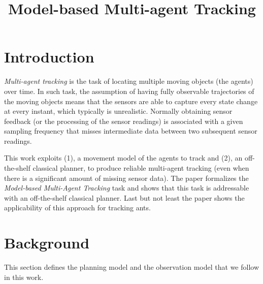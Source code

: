 \documentclass[letterpaper]{article} %
\begin{document}
\title{Model-based Multi-agent Tracking}




\maketitle
\begin{abstract}
\end{abstract}


\section{Introduction}
\label{sec:introduction}

{\em Multi-agent tracking} is the task of locating multiple moving objects (the agents) over time. In such task, the assumption of having fully observable trajectories of the moving objects means that the sensors are able to capture every state change at every instant, which typically is unrealistic. Normally obtaining sensor feedback (or the processing of the sensor readings) is associated with a given sampling frequency that misses intermediate data between two subsequent sensor readings.

This work exploits (1), a movement model of the agents to track and (2), an off-the-shelf classical planner, to produce reliable multi-agent tracking (even when there is a significant amount of missing sensor data). The paper formalizes the {\em Model-based Multi-Agent Tracking} task and shows that this task is addressable with an off-the-shelf classical planner. Last but not least the paper shows the applicability of this approach for tracking ants.


\section{Background}
\label{sec:background}
This section defines the planning model and the observation model that we follow in this work.
\end{document}
